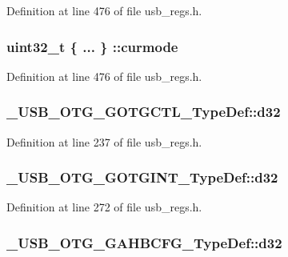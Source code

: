Definition at line 476 of file usb\-\_\-regs.\-h.

\hypertarget{group___u_s_b___o_t_g___d_r_i_v_e_r_gabcf53dcf7f028e80196468cb42552691}{
\subsubsection[{curmode}]{\setlength{\rightskip}{0pt plus 5cm}uint32\-\_\-t \{ ... \} \-::curmode}}\label{group___u_s_b___o_t_g___d_r_i_v_e_r_gabcf53dcf7f028e80196468cb42552691}


Definition at line 476 of file usb\-\_\-regs.\-h.

\hypertarget{group___u_s_b___o_t_g___d_r_i_v_e_r_gaf6bba95362f08d9514ab8096cb8cf6a7}{
\subsubsection[{d32}]{ \-\_\-\-U\-S\-B\-\_\-\-O\-T\-G\-\_\-\-G\-O\-T\-G\-C\-T\-L\-\_\-\-Type\-Def\-::d32}}\label{group___u_s_b___o_t_g___d_r_i_v_e_r_gaf6bba95362f08d9514ab8096cb8cf6a7}


Definition at line 237 of file usb\-\_\-regs.\-h.

\hypertarget{group___u_s_b___o_t_g___d_r_i_v_e_r_gaccd55daf5f4a8c68ad1a4d257c19538c}{
\subsubsection[{d32}]{ \-\_\-\-U\-S\-B\-\_\-\-O\-T\-G\-\_\-\-G\-O\-T\-G\-I\-N\-T\-\_\-\-Type\-Def\-::d32}}\label{group___u_s_b___o_t_g___d_r_i_v_e_r_gaccd55daf5f4a8c68ad1a4d257c19538c}


Definition at line 272 of file usb\-\_\-regs.\-h.

\hypertarget{group___u_s_b___o_t_g___d_r_i_v_e_r_ga30dd79fdb9e4a7f5cb48555928b8fbe3}{
\subsubsection[{d32}]{ \-\_\-\-U\-S\-B\-\_\-\-O\-T\-G\-\_\-\-G\-A\-H\-B\-C\-F\-G\-\_\-\-Type\-Def\-::d32}}\label{group___u_s_b___o_t_g___d_r_i_v_e_r_ga30dd79fdb9e4a7f5cb48555928b8fbe3}


